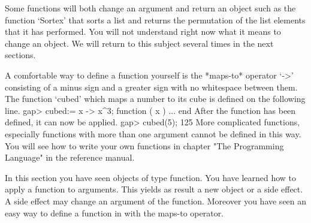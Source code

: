 Some functions will both change an argument  and return an object such as
the function `Sortex'  that sorts a  list and returns the permutation  of
the list  elements that it has  performed.  You will not understand right
now what it means  to change an object.   We will return to this  subject
several times in the next sections.

%
A comfortable way to define a function yourself is the *maps-to* operator
`->' consisting of  a minus sign and a   greater sign with  no whitespace
between them. The function  `cubed' which maps a  number  to its  cube is
defined on the following line.
\beginexample
    gap> cubed:= x -> x^3;
    function ( x ) ... end 
\endexample
After the function has been defined, it can now be applied.
\beginexample
    gap> cubed(5);
    125 
\endexample
More complicated  functions,  especially functions   with  more than  one
argument cannot be  defined in this way. You  will see how to  write your
own   {\GAP}   functions in chapter   "The  Programming  Language" in the
reference manual.

In this section you have seen {\GAP} objects of  type function.  You have
learned how to apply a function to  arguments.  This  yields as result  a
new object or a side effect.  A side effect may change an argument of the
function.   Moreover you have seen an easy  way  to define a  function in
{\GAP} with the maps-to operator.

